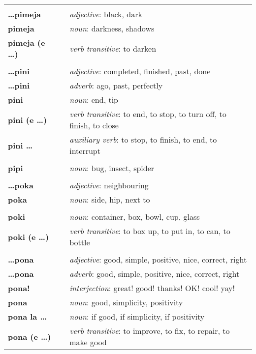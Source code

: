 \begin{supertabular}{p{2,5cm}|ll}
 && \\ %
\textbf{\dots pimeja} && \textit{adjective}: black, dark \\ 
\textbf{pimeja} && \textit{noun}: darkness, shadows \\ 
\textbf{pimeja (e \dots)} && \textit{verb transitive}: to darken \\ 
 && \\ %
\textbf{\dots pini} && \textit{adjective}: completed, finished, past, done \\ 
\textbf{\dots pini} && \textit{adverb}: ago, past, perfectly \\ 
\textbf{pini} && \textit{noun}: end, tip \\ 
\textbf{pini (e \dots)} && \textit{verb transitive}: to end, to stop, to turn off, to finish, to close \\ 
\textbf{pini \dots } && \textit{auxiliary verb}: to stop, to finish, to end, to interrupt \\ 
 && \\ %
\textbf{pipi} && \textit{noun}: bug, insect, spider \\ 
 && \\ %
\textbf{\dots poka} && \textit{adjective}: neighbouring \\ 
\textbf{poka} && \textit{noun}: side, hip, next to \\ 
 && \\ %
\textbf{poki} && \textit{noun}: container, box, bowl, cup, glass \\ 
\textbf{poki (e \dots)} && \textit{verb transitive}: to box up, to put in, to can, to bottle \\ 
 && \\ %
\textbf{\dots pona} && \textit{adjective}: good, simple, positive, nice, correct, right \\ 
\textbf{\dots pona} && \textit{adverb}: good, simple, positive, nice, correct, right \\ 
\textbf{pona!} && \textit{interjection}: great! good! thanks! OK! cool! yay! \\ 
\textbf{pona} && \textit{noun}: good, simplicity, positivity \\ 
\textbf{pona la \dots} && \textit{noun}: if good, if simplicity, if positivity \\ 
\textbf{pona (e \dots)} && \textit{verb transitive}: to improve, to fix, to repair, to make good \\ 

\end{supertabular}

